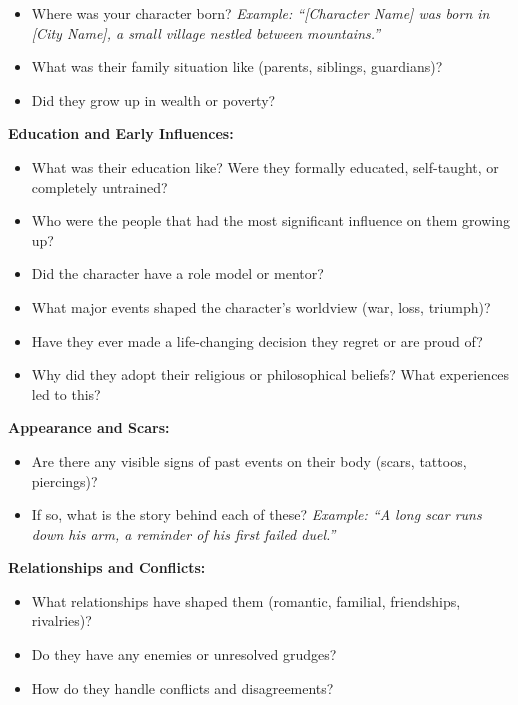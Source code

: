 \begin{itemize}
\item
  Where was your character born? \emph{Example: ``{[}Character Name{]}
  was born in {[}City Name{]}, a small village nestled between
  mountains.''}
\item
  What was their family situation like (parents, siblings, guardians)?
\item
  Did they grow up in wealth or poverty?
\end{itemize}

\textbf{Education and Early Influences:}

\begin{itemize}
\tightlist
\item
  What was their education like? Were they formally educated,
  self-taught, or completely untrained?
\item
  Who were the people that had the most significant influence on them
  growing up?
\item
  Did the character have a role model or mentor?
\item
  What major events shaped the character's worldview (war, loss,
  triumph)?
\item
  Have they ever made a life-changing decision they regret or are proud
  of?
\item
  Why did they adopt their religious or philosophical beliefs? What
  experiences led to this?
\end{itemize}

\textbf{Appearance and Scars:}

\begin{itemize}
\tightlist
\item
  Are there any visible signs of past events on their body (scars,
  tattoos, piercings)?
\item
  If so, what is the story behind each of these? \emph{Example: ``A long
  scar runs down his arm, a reminder of his first failed duel.''}
\end{itemize}

\textbf{Relationships and Conflicts:}

\begin{itemize}
\tightlist
\item
  What relationships have shaped them (romantic, familial, friendships,
  rivalries)?
\item
  Do they have any enemies or unresolved grudges?
\item
  How do they handle conflicts and disagreements?
\end{itemize}

